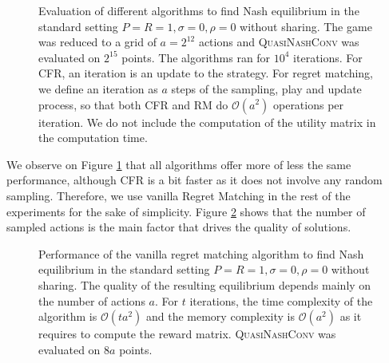 \documentclass[preprint,12pt,authoryear,doubleblind]{elsarticle}
\theoremstyle{definition}
\begin{document}
\begin{figure}[htbp]
  \centering
  \begin{minipage}[t]{0.48\textwidth}
    \centering
    
  \end{minipage}
  \hfill
  \begin{minipage}[t]{0.48\textwidth}
    \centering
    
  \end{minipage}
  \caption{Evaluation of different algorithms to find Nash equilibrium in the standard setting $P=R=1, \sigma=0, \rho=0$ without sharing. The game was reduced to a grid of $a=2^{12}$ actions and \textsc{QuasiNashConv} was evaluated on $2^{15}$ points. The algorithms ran for $10^4$ iterations. For CFR, an iteration is an update to the strategy. For regret matching, we define an iteration as $a$ steps of the sampling, play and update process, so that both CFR and RM do $\mathcal{O}(a^2)$ operations per iteration. We do not include the computation of the utility matrix in the computation time.}
  \label{fig:rm-different}  
\end{figure}

We observe on Figure \ref{fig:rm-different} that all algorithms offer more of less the same performance, although CFR is a bit faster as it does not involve any random sampling. Therefore, we use vanilla Regret Matching in the rest of the experiments for the sake of simplicity. Figure \ref{fig:rm-size} shows that the number of sampled actions is the main factor that drives the quality of solutions.

\begin{figure}[htbp]
  \centering
  \begin{minipage}[t]{0.48\textwidth}
    \centering
    
  \end{minipage}
  \hfill
  \begin{minipage}[t]{0.48\textwidth}
    \centering
    
  \end{minipage}
  \caption{Performance of the vanilla regret matching algorithm to find Nash equilibrium in the standard setting $P=R=1, \sigma=0, \rho=0$ without sharing. The quality of the resulting equilibrium depends mainly on the number of actions $a$. For $t$ iterations, the time complexity of the algorithm is $\mathcal{O}(t a^2)$ and the memory complexity is $\mathcal{O}(a^2)$ as it requires to compute the reward matrix. \textsc{QuasiNashConv} was evaluated on $8 a$ points.}
  \label{fig:rm-size}  
\end{figure}
\end{document}
